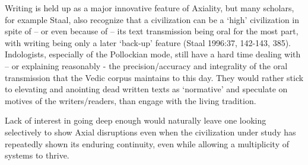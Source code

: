 Writing is held up as a major innovative feature of Axiality, but many scholars, for example Staal, also recognize that a civilization can be a ‘high’ civilization in spite of – or even because of – its text transmission being oral for the most part, with writing being only a later ‘back-up’ feature (Staal 1996:37, 142-143, 385). Indologists, especially of the Pollockian mode, still have a hard time dealing with – or explaining reasonably - the precision/accuracy and integrality of the oral transmission that the Vedic corpus maintains to this day. They would rather stick to elevating and anointing dead written texts as ‘normative’ and speculate on motives of the writers/readers, than engage with the living tradition.

Lack of interest in going deep enough would naturally leave one looking selectively to show Axial disruptions even when the civilization under study has repeatedly shown its enduring continuity, even while allowing a multiplicity of systems to thrive.

